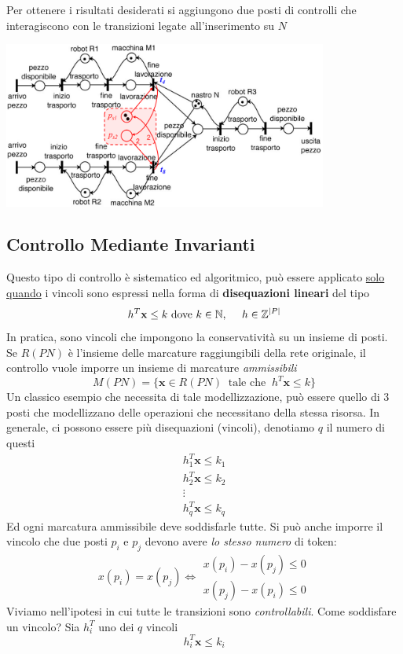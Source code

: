 \documentclass[10pt, letterpaper]{report}
\begin{document}
Per ottenere i risultati desiderati si aggiungono due posti di controlli che interagiscono con le transizioni legate all'inserimento su $N$
\begin{center}
    \includegraphics[width=0.8\textwidth]{images/postiControllo.png}
\end{center}
\subsection{Controllo Mediante Invarianti}
Questo tipo di controllo è sistematico ed algoritmico, può essere applicato \underline{solo quando} i vincoli sono espressi nella forma di \textbf{disequazioni lineari} del tipo 
$$ h^T\mathbf x \le k \text{ dove }k\in \N,  \ \ \ \ h\in \Z^{|P|}$$
In pratica, sono vincoli che impongono la conservatività su un insieme di posti. Se $R(PN)$ è l'insieme delle marcature raggiungibili della rete originale, il controllo vuole imporre un insieme di marcature \textit{ammissibili}
$$ M(PN)=\{\mathbf x \in R(PN) \  \text{ tale che } \ h^T\mathbf x \le k \}$$
Un classico esempio che necessita di tale modellizzazione, può essere quello di 3 posti che modellizzano delle operazioni che necessitano della stessa risorsa. In generale, ci possono essere più disequazioni (vincoli), denotiamo $q$ il numero di questi 
$$ \begin{matrix}
    h_1^T\mathbf x \le k_1\\ 
    h_2^T\mathbf x \le k_2\\ \vdots \\ 
    h_q^T\mathbf x \le k_q
\end{matrix}$$
Ed ogni marcatura ammissibile deve soddisfarle tutte.
Si può anche imporre il vincolo che due posti $p_i$ e $p_j$ devono avere \textit{lo stesso numero} di token:
$$x(p_i)=x(p_j)\iff \begin{matrix}
    x(p_i)-x(p_j) \le 0\\ 
    x(p_j)-x(p_i) \le 0
\end{matrix}$$
Viviamo nell'ipotesi in cui tutte le transizioni sono \textit{controllabili}. Come soddisfare un vincolo? Sia $h_i^T$ uno dei $q$ vincoli$$  h_i^T\mathbf x \le k_i$$
\end{document}
